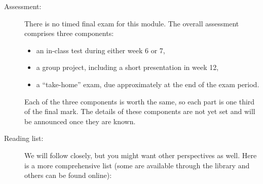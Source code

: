 \documentclass[a4paper, 12pt]{article}
\begin{document}
\begin{description}
    \item[Assessment:] There is no timed final exam for this module. The overall
    assessment comprises three components:
    \begin{itemize}
      \item an in-class test during either week 6 or 7,
      \item a group project, including a short presentation in week 12,
      \item a ``take-home'' exam, due approximately at the end of the exam period.
    \end{itemize}
    Each of the three components is worth the same, so each part is one third of
    the final mark. The details of these components are not yet set and will be
    announced once they are known.
    \vspace{1cm}
    \item[Reading list:] We will follow \cite{MR1340426} closely, but you might
    want other perspectives as well. Here is a more comprehensive list (some are
    available through the library and others can be found online):
    \nocite{*}
    
    
\end{description}
\end{document}
